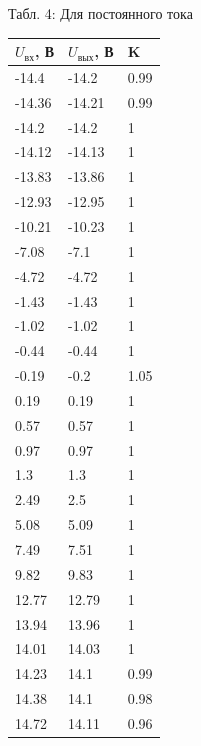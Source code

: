 {Табл. 4: Для постоянного тока

\small
\begin{tabular}{|l|l|l|}
\hline
$U_{вх}$, В & $U_{вых}$, В & K \\
\hline
-14.4&-14.2&0.99\\
\hline
-14.36&-14.21&0.99\\
\hline
-14.2&-14.2&1\\
\hline
-14.12&-14.13&1\\
\hline
-13.83&-13.86&1\\
\hline
-12.93&-12.95&1\\
\hline
-10.21&-10.23&1\\
\hline
-7.08&-7.1&1\\
\hline
-4.72&-4.72&1\\
\hline
-1.43&-1.43&1\\
\hline
-1.02&-1.02&1\\
\hline
-0.44&-0.44&1\\
\hline
-0.19&-0.2&1.05\\
\hline
0.19&0.19&1\\
\hline
0.57&0.57&1\\
\hline
0.97&0.97&1\\
\hline
1.3&1.3&1\\
\hline
2.49&2.5&1\\
\hline
5.08&5.09&1\\
\hline
7.49&7.51&1\\
\hline
9.82&9.83&1\\
\hline
12.77&12.79&1\\
\hline
13.94&13.96&1\\
\hline
14.01&14.03&1\\
\hline
14.23&14.1&0.99\\
\hline
14.38&14.1&0.98\\
\hline
14.72&14.11&0.96\\
\hline
\end{tabular}}

